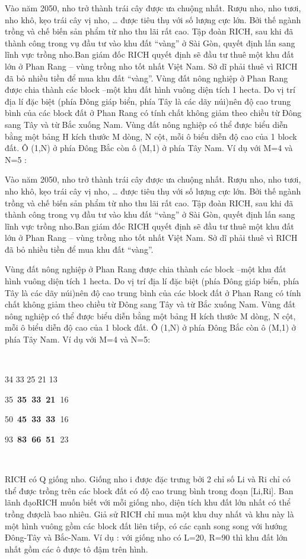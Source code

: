 Vào năm 2050, nho trở thành trái cây được ưa chuộng nhất. Rượu nho, nho tươi, nho khô, kẹo trái cây vị nho, … được tiêu thụ với số lượng cực lớn. Bởi thế ngành trồng và chế biến sản phẩm từ nho thu lãi rất cao. Tập đoàn RICH, sau khi đã thành công trong vụ đầu tư vào khu đất “vàng” ở Sài Gòn, quyết định lấn sang lĩnh vực trồng nho.Ban giám đốc RICH quyết định sẽ đầu tư thuê một khu đất lớn ở Phan Rang – vùng trồng nho tốt nhất Việt Nam. Sở dĩ phải thuê vì RICH đã bỏ nhiều tiền để mua khu đất “vàng”. Vùng đất nông nghiệp ở Phan Rang được chia thành các block –một khu đất hình vuông diện tích 1 hecta. Do vị trí địa lí đặc biệt (phía Đông giáp biển, phía Tây là các dãy núi)nên độ cao trung bình của các block đất ở Phan Rang có tính chất không giảm theo chiều từ Đông sang Tây và từ Bắc xuống Nam. Vùng đất nông nghiệp có thể được biểu diễn bằng một bảng H kích thước M dòng, N cột, mỗi ô biểu diễn độ cao của 1 block đất. Ô (1,N) ở phía Đông Bắc còn ô (M,1) ở phía Tây Nam. Ví dụ với M=4 và N=5 :

Vào năm 2050, nho trở thành trái cây được ưa chuộng nhất. Rượu nho, nho tươi, nho khô, kẹo trái cây vị nho, … được tiêu thụ với số lượng cực lớn. Bởi thế ngành trồng và chế biến sản phẩm từ nho thu lãi rất cao. Tập đoàn RICH, sau khi đã thành công trong vụ đầu tư vào khu đất “vàng” ở Sài Gòn, quyết định lấn sang lĩnh vực trồng nho.Ban giám đốc RICH quyết định sẽ đầu tư thuê một khu đất lớn ở Phan Rang – vùng trồng nho tốt nhất Việt Nam. Sở dĩ phải thuê vì RICH đã bỏ nhiều tiền để mua khu đất “vàng”.

Vùng đất nông nghiệp ở Phan Rang được chia thành các block –một khu đất hình vuông diện tích 1 hecta. Do vị trí địa lí đặc biệt (phía Đông giáp biển, phía Tây là các dãy núi)nên độ cao trung bình của các block đất ở Phan Rang có tính chất không giảm theo chiều từ Đông sang Tây và từ Bắc xuống Nam. Vùng đất nông nghiệp có thể được biểu diễn bằng một bảng H kích thước M dòng, N cột, mỗi ô biểu diễn độ cao của 1 block đất. Ô (1,N) ở phía Đông Bắc còn ô (M,1) ở phía Tây Nam. Ví dụ với M=4 và N=5:

 

34 33 25 21 13

35 \textbf{35 }\textbf{33 }\textbf{21 }16

50 \textbf{45 }\textbf{33 }\textbf{33 }16

93 \textbf{83 }\textbf{66 }\textbf{51 }23

 

RICH có Q giống nho. Giống nho i được đặc trưng bởi 2 chỉ số Li và Ri chỉ có thể được trồng trên các block đất có độ cao trung bình trong đoạn [Li,Ri]. Ban lãnh đạoRICH muốn biết với mỗi giống nho, diện tích khu đất lớn nhất có thể trồng đượclà bao nhiêu. Giả sử RICH chỉ mua một khu duy nhất và khu này là một hình vuông gồm các block đất liên tiếp, có các cạnh song song với hướng Đông-Tây và Bắc-Nam. Ví dụ : với giống nho có L=20, R=90 thì khu đất lớn nhất gồm các ô được tô đậm trên hình.